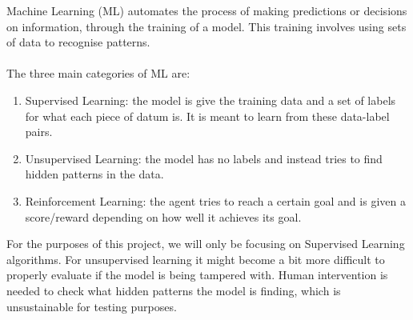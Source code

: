 Machine Learning (ML) automates the process of making predictions or decisions on information, through the training of a model. 
This training involves using sets of data to recognise patterns.
\\ \\
The three main categories of ML are:
\begin{enumerate}
    \item Supervised Learning: the model is give the training data and a set of labels for what each piece of datum is. It is meant to learn from these data-label pairs.
    
    \item Unsupervised Learning: the model has no labels and instead tries to find hidden patterns in the data.
    
    \item Reinforcement Learning: the agent tries to reach a certain goal and is given a score/reward depending on how well it achieves its goal.
\end{enumerate}
For the purposes of this project, we will only be focusing on Supervised Learning algorithms. 
For unsupervised learning it might become a bit more difficult to properly evaluate if the model is being tampered with. 
Human intervention is needed to check what hidden patterns the model is finding, which is unsustainable for testing purposes.


